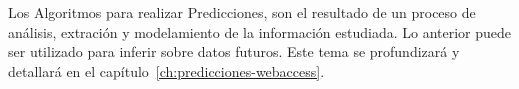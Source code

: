 
  Los Algoritmos para realizar Predicciones, son el resultado de un proceso de análisis, extración y modelamiento de la información estudiada. Lo anterior puede ser utilizado para inferir sobre datos futuros. Este tema se profundizará y detallará en el capítulo~\ref{ch:predicciones-webaccess}.

